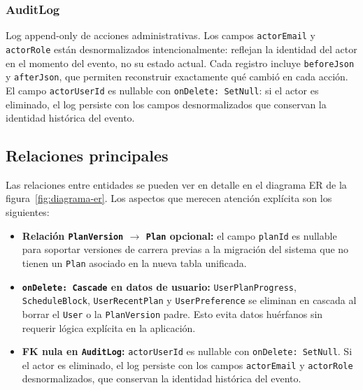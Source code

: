 \documentclass[12pt, a4paper]{report}
\begin{document}
\subsubsection*{AuditLog}

Log append-only de acciones administrativas. Los campos \texttt{actorEmail} y
\texttt{actorRole} están desnormalizados intencionalmente: reflejan la identidad del actor
en el momento del evento, no su estado actual. Cada registro incluye \texttt{beforeJson} y
\texttt{afterJson}, que permiten reconstruir exactamente qué cambió en cada acción. El
campo \texttt{actorUserId} es nullable con \texttt{onDelete: SetNull}: si el actor es
eliminado, el log persiste con los campos desnormalizados que conservan la identidad
histórica del evento.

\subsection{Relaciones principales}

Las relaciones entre entidades se pueden ver en detalle en el diagrama ER de la
figura~\ref{fig:diagrama-er}. Los aspectos que merecen atención explícita son los
siguientes:

\begin{itemize}
  \item \textbf{Relación \texttt{PlanVersion} $\longrightarrow$ \texttt{Plan} opcional:}
        el campo \texttt{planId} es nullable para soportar versiones de carrera previas a la
        migración del sistema que no tienen un \texttt{Plan} asociado en la nueva tabla
        unificada.

  \item \textbf{\texttt{onDelete: Cascade} en datos de usuario:} \texttt{UserPlanProgress},
        \texttt{ScheduleBlock}, \texttt{UserRecentPlan} y \texttt{UserPreference} se
        eliminan en cascada al borrar el \texttt{User} o la \texttt{PlanVersion}
        padre. Esto evita datos huérfanos sin requerir lógica explícita en la aplicación.

  \item \textbf{FK nula en \texttt{AuditLog}:} \texttt{actorUserId} es nullable con
        \texttt{onDelete: SetNull}. Si el actor es eliminado, el log persiste con los campos
        \texttt{actorEmail} y \texttt{actorRole} desnormalizados, que conservan la identidad
        histórica del evento.
\end{itemize}
\end{document}
